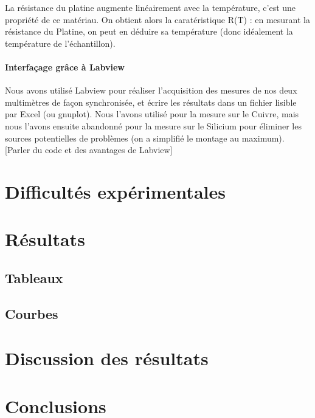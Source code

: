 La résistance du platine augmente linéairement avec la température, c'est une propriété de ce matériau.
On obtient alors la caratéristique R(T) : en mesurant la résistance du Platine, on peut en déduire sa température (donc idéalement la température de l'échantillon).

\paragraph*{Interfaçage grâce à Labview}
Nous avons utilisé Labview pour réaliser l'acquisition des mesures de nos deux multimètres de façon synchronisée, et écrire les résultats dans un fichier lisible par Excel (ou gnuplot).
Nous l'avons utilisé pour la mesure sur le Cuivre, mais nous l'avons ensuite abandonné pour la mesure sur le Silicium pour éliminer les sources potentielles de problèmes (on a simplifié le montage au maximum).
[Parler du code et des avantages de Labview]

\section*{Difficultés expérimentales}


\section*{Résultats}

\subsection*{Tableaux}

\subsection*{Courbes}


\section*{Discussion des résultats}


\section*{Conclusions}

